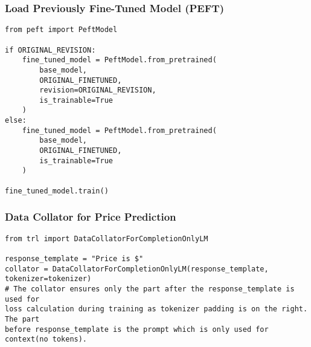 \subsubsection{Load Previously Fine-Tuned Model (PEFT)}
\begin{tcolorbox}[colback=yellow!5!white, colframe=yellow!75!black, title=Resume LoRA Checkpoint]
\begin{verbatim}
from peft import PeftModel

if ORIGINAL_REVISION:
    fine_tuned_model = PeftModel.from_pretrained(
        base_model,
        ORIGINAL_FINETUNED,
        revision=ORIGINAL_REVISION,
        is_trainable=True
    )
else:
    fine_tuned_model = PeftModel.from_pretrained(
        base_model,
        ORIGINAL_FINETUNED,
        is_trainable=True
    )

fine_tuned_model.train()
\end{verbatim}
\end{tcolorbox}

\subsubsection{Data Collator for Price Prediction}
\begin{tcolorbox}[colback=green!5!white, colframe=green!75!black, title=Data Collator]
\begin{verbatim}
from trl import DataCollatorForCompletionOnlyLM

response_template = "Price is $"
collator = DataCollatorForCompletionOnlyLM(response_template, 
tokenizer=tokenizer)
# The collator ensures only the part after the response_template is used for
loss calculation during training as tokenizer padding is on the right. The part 
before response_template is the prompt which is only used for context(no tokens).
\end{verbatim}
\end{tcolorbox}

